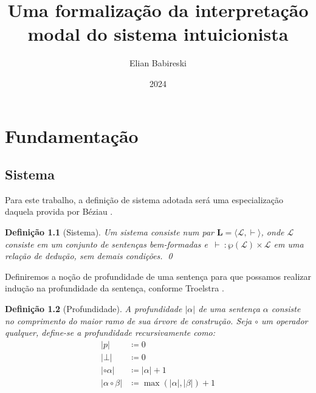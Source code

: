 \documentclass{report}
\newtheorem{definition}{Definição}
\begin{document}
    \title{Uma formalização da interpretação modal do sistema intuicionista}
    \author{Elian Babireski}
    \date{2024}

    \maketitle

    \tableofcontents

    
    

    \chapter{Fundamentação}

    \section{Sistema}

    Para este trabalho, a definição de sistema adotada será uma especialização daquela provida por Béziau \cite{Béziau}.

    \begin{definition}[Sistema]
        Um sistema consiste num par $\mathbf{L} = \langle \mathcal{L}, \vdash\rangle$, onde $\mathcal{L}$ consiste em um conjunto de sentenças bem-formadas e $\, \vdash \: : \wp(\mathcal{L}) \times \mathcal{L} $ em uma relação de dedução, sem demais condições.
        \qed
    \end{definition}

    Definiremos a noção de profundidade de uma sentença para que possamos realizar indução na profundidade da sentença, conforme Troelstra \cite{Troelstra}.

    \begin{definition}[Profundidade]
        A profundidade $|\alpha|$ de uma sentença $\alpha$ consiste no comprimento do maior ramo de sua árvore de construção. Seja $\circ$ um operador qualquer, define-se a profundidade recursivamente como:
        \begin{align*}
            |p|                  & \coloneqq 0                           \\
            |\bot|               & \coloneqq 0                           \\
            |\circ \alpha|       & \coloneqq |\alpha| + 1                \\
            |\alpha \circ \beta| & \coloneqq \max(|\alpha|, |\beta|) + 1
            \tag*{\qed} 
        \end{align*}
    \end{definition}
\end{document}
